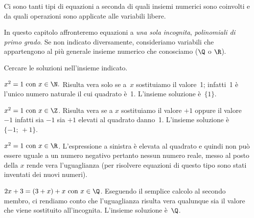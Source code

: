 % 

Ci sono tanti tipi di equazioni a seconda di quali insiemi numerici sono 
coinvolti e da quali operazioni sono applicate alle variabili libere.

In questo capitolo affronteremo equazioni a \emph{una sola incognita}, 
\emph{polinomiali di primo grado}. 
Se non indicato diversamente, consideriamo variabili che appartengono 
al più generale insieme numerico che conosciamo (\(\Q\) o \(\R\)).


\begin{esempio}{}{}
Cercare le soluzioni nell'insieme indicato.
\begin{enumeratea}
\item \(x^{2} = 1 \text{ con }x\in\N.\)
Risulta vera solo se a~\(x\) sostituiamo il valore~1; infatti~1 è
l'unico numero naturale il cui quadrato è~1.
L'insieme soluzione è~\(\{1\}\).
\item \(x^{2} = 1 \text{ con }x\in\Z\).
Risulta vera se a
\(x\) sostituiamo il valore \(+1\) oppure il valore~\(-1\) infatti sia 
\(-1\) sia \(+1\) elevati al quadrato danno~1. 
L'insieme soluzione è\(\{-1;~ +1\}\).
\item \(x^{2} = 1\text{ con }x\in\R\).
L'espressione a sinistra è elevata al quadrato e quindi non può essere 
uguale a un numero negativo pertanto nessun numero reale, messo al posto 
della \(x\) rende vera l'uguaglianza (per risolvere equazioni di questo 
tipo sono stati inventati dei nuovi numeri).
\item \(2x+3=(3+x)+x \text{ con } x\in\Q\).
Eseguendo il semplice calcolo al secondo membro, ci rendiamo conto che 
l'uguaglianza risulta vera qualunque sia il valore che viene sostituito 
all'incognita. 
L'insieme soluzione è~\(\Q\).
\end{enumeratea}
\end{esempio}

